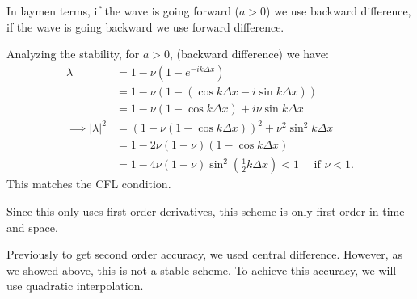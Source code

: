 \documentclass[../main/main.tex]{subfiles}
\begin{document}
\begin{example}
    In laymen terms, if the wave is going forward ($a>0$) we use backward difference, if the wave is going backward we use forward difference. 
\end{example}
Analyzing the stability, for $a>0$, (backward difference) we have:
\begin{align*} 
    \lambda &= 1 - \nu(1-e^{-ik\Delta x})\\
            &= 1-\nu(1-(\cos k\Delta x - i \sin k \Delta x)) \\
            &= 1-\nu(1-\cos k \Delta x) + i \nu \sin k \Delta x \\
    \implies |\lambda|^2 &= (1-\nu(1-\cos k\Delta x))^2 + \nu^2 \sin^2 k \Delta x \\
                         &= 1 - 2\nu (1-\nu) (1-\cos k\Delta x) \\
                         &= 1-4\nu(1-\nu) \sin^2 \left( \frac{1}{2}k \Delta x \right) < 1 \quad\text{ if }\nu<1
.\end{align*}
This matches the CFL condition. 
\begin{remark}
    Since this only uses first order derivatives, this scheme is only first order in time and space.
\end{remark}
Previously to get second order accuracy, we used central difference. However, as we showed above, this is not a stable scheme. To achieve this accuracy, we will use quadratic interpolation.
\end{document}
